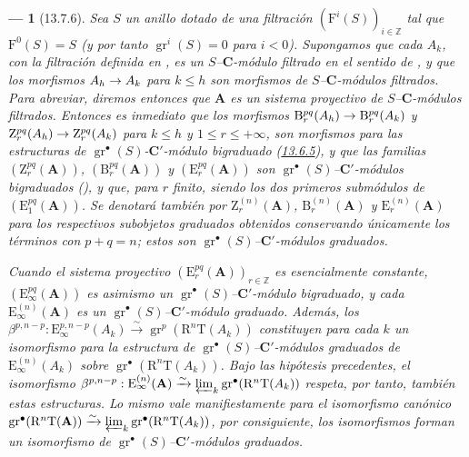 \documentclass[10pt,oneside,openany]{book}
\theoremstyle{egaenv}\newtheorem*{env}{---}
\theoremstyle{egastatement}
\theoremstyle{egadescription}
\renewcommand{\leq}{\leqslant}
\renewcommand{\to}{\mathchoice{\longrightarrow}{\rightarrow}{\rightarrow}{\rightarrow}}
\begin{document}
\begin{env}[13.7.6]
\label{0.13.7.6}
\label{0.13.7.6-fr}
Sea $S$ un anillo dotado de una filtración
$(\mathrm F^i(S))_{i\in\mathbb Z}$ tal que
$\mathrm F^0(S)=S$ (y por tanto
$\operatorname{gr}^i(S)=0$ para $i<0$).
Supongamos que cada $A_k$, con la filtración definida en
, es un
$S$--$\boldsymbol{C}$-\emph{módulo filtrado} en el sentido de , y que los
morfismos $A_h\to A_k$ para $k\leq h$ son morfismos de
$S$--$\boldsymbol{C}$-módulos filtrados.
Para abreviar, diremos entonces que $\mathbf A$ es un
\emph{sistema proyectivo de $S$--$\boldsymbol{C}$-módulos filtrados}. Entonces es inmediato que los morfismos $\mathrm B_r^{pq}(A_h)\to\mathrm B_r^{pq}(A_k)$ y $\mathrm Z_r^{pq}(A_h)\to\mathrm Z_r^{pq}(A_k)$ para $k\leq h$ y
$1\leq r\leq+\infty$, son morfismos para las estructuras de $\operatorname{gr}^\bullet(S)$-$\boldsymbol{C}'$-\emph{módulo bigraduado} (\hyperref[0.13.6.5-fr]{13.6.5}), y que las familias $(\mathrm Z_r^{pq}(\mathbf A))$, $(\mathrm B_r^{pq}(\mathbf A))$ y $(\mathrm E_r^{pq}(\mathbf A))$ son $\operatorname{gr}^\bullet(S)$--$\boldsymbol{C}'$-\emph{módulos bigraduados}
(), y que, para $r$ finito, siendo los dos primeros submódulos de $(\mathrm E_1^{pq}(\mathbf A))$. Se denotará también por $\mathrm Z_r^{(n)}(\mathbf A)$,
$\mathrm B_r^{(n)}(\mathbf A)$ y
$\mathrm E_r^{(n)}(\mathbf A)$ para los respectivos subobjetos graduados
obtenidos conservando únicamente los términos con $p+q=n$; estos son
$\operatorname{gr}^\bullet(S)$--$\boldsymbol{C}'$-\emph{módulos graduados}.

Cuando el sistema proyectivo
$(\mathrm E_r^{pq}(\mathbf A))_{r\in\mathbb Z}$ es esencialmente constante,
$(\mathrm E_\infty^{pq}(\mathbf A))$ es asimismo un
$\operatorname{gr}^\bullet(S)$--$\boldsymbol{C}'$-módulo bigraduado, y cada
$\mathrm E_\infty^{(n)}(\mathbf A)$ es un
$\operatorname{gr}^\bullet(S)$--$\boldsymbol{C}'$-módulo graduado. Además, los $\beta^{p,n-p}:\mathrm E_\infty^{p,n-p}(A_k)\xrightarrow{\sim}
\operatorname{gr}^p(\mathrm R^n\mathrm T(A_k))$ constituyen para cada $k$ un isomorfismo para la estructura de $\operatorname{gr}^\bullet(S)$--$\boldsymbol{C}'$-módulos graduados de
$\mathrm E_\infty^{(n)}(A_k)$ sobre
$\operatorname{gr}^\bullet(\mathrm R^n\mathrm T(A_k))$.
Bajo las hipótesis precedentes, el isomorfismo
$\beta^{p,n-p}:\mathrm E_\infty^{(n)}(\mathbf A)\xrightarrow{\sim}
\varprojlim_k\operatorname{gr}^\bullet(\mathrm R^n\mathrm T(A_k))$
respeta, por tanto, también estas estructuras.
Lo mismo vale manifiestamente para el isomorfismo canónico
$\operatorname{gr}^\bullet(\mathrm R^n\mathrm T(\mathbf A))
\xrightarrow{\sim}
\varprojlim_k\operatorname{gr}^\bullet(\mathrm R^n\mathrm T(A_k))$,
por consiguiente, los isomorfismos  forman un
isomorfismo de
$\operatorname{gr}^\bullet(S)$--$\boldsymbol{C}'$-\emph{módulos graduados}.
\end{env}
\end{document}
